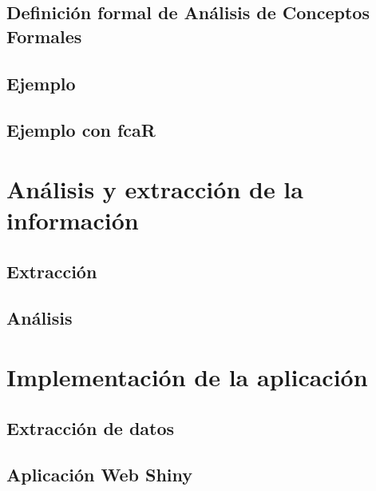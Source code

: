 \documentclass[12pt, a4paper, twoside]{article}
\begin{document}
\subsection{Definición formal de Análisis de Conceptos Formales}


\subsection{Ejemplo}


\subsection{Ejemplo con fcaR}

\newpage\cleardoublepage


\section{Análisis y extracción de la información}

\subsection{Extracción}


\subsection{Análisis}

\newpage\cleardoublepage


\section{Implementación de la aplicación}

\subsection{Extracción de datos}


\subsection{Aplicación Web Shiny}

\newpage\cleardoublepage
\end{document}
